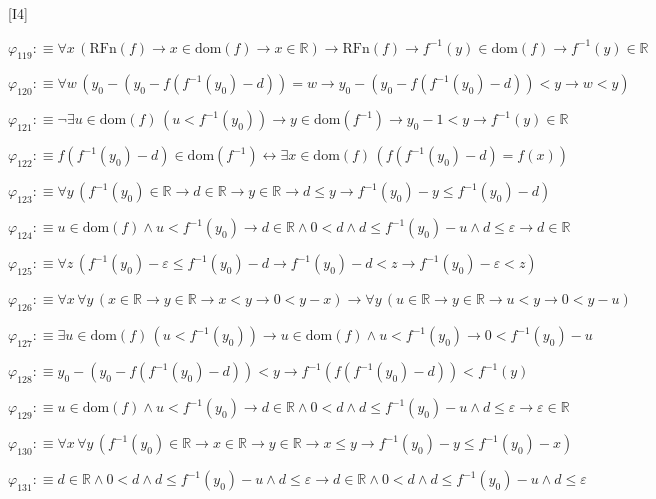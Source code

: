 \begin{fullproof}{[I4]}
\begin{abbrevlist}
\item $\varphi_{119} :\equiv \forall x\,(\mathrm{RFn}(f) \to x \in \mathrm{dom}(f) \to x \in \mathbb{R}) \to \mathrm{RFn}(f) \to f^{-1}(y) \in \mathrm{dom}(f) \to f^{-1}(y) \in \mathbb{R}$
\item $\varphi_{120} :\equiv \forall w\,(y_{0} - (y_{0} - f(f^{-1}(y_{0}) - d)) = w \to y_{0} - (y_{0} - f(f^{-1}(y_{0}) - d)) < y \to w < y)$
\item $\varphi_{121} :\equiv \neg \exists u \in \mathrm{dom}(f)\,(u < f^{-1}(y_{0})) \to y \in \mathrm{dom}(f^{-1}) \to y_{0} - 1 < y \to f^{-1}(y) \in \mathbb{R}$
\item $\varphi_{122} :\equiv f(f^{-1}(y_{0}) - d) \in \mathrm{dom}(f^{-1}) \leftrightarrow \exists x \in \mathrm{dom}(f)\,(f(f^{-1}(y_{0}) - d) = f(x))$
\item $\varphi_{123} :\equiv \forall y\,(f^{-1}(y_{0}) \in \mathbb{R} \to d \in \mathbb{R} \to y \in \mathbb{R} \to d \leq y \to f^{-1}(y_{0}) - y \leq f^{-1}(y_{0}) - d)$
\item $\varphi_{124} :\equiv u \in \mathrm{dom}(f) \land u < f^{-1}(y_{0}) \to d \in \mathbb{R} \land 0 < d \land d \leq f^{-1}(y_{0}) - u \land d \leq \varepsilon \to d \in \mathbb{R}$
\item $\varphi_{125} :\equiv \forall z\,(f^{-1}(y_{0}) - \varepsilon \leq f^{-1}(y_{0}) - d \to f^{-1}(y_{0}) - d < z \to f^{-1}(y_{0}) - \varepsilon < z)$
\item $\varphi_{126} :\equiv \forall x\,\forall y\,(x \in \mathbb{R} \to y \in \mathbb{R} \to x < y \to 0 < y - x) \to \forall y\,(u \in \mathbb{R} \to y \in \mathbb{R} \to u < y \to 0 < y - u)$
\item $\varphi_{127} :\equiv \exists u \in \mathrm{dom}(f)\,(u < f^{-1}(y_{0})) \to u \in \mathrm{dom}(f) \land u < f^{-1}(y_{0}) \to 0 < f^{-1}(y_{0}) - u$
\item $\varphi_{128} :\equiv y_{0} - (y_{0} - f(f^{-1}(y_{0}) - d)) < y \to f^{-1}(f(f^{-1}(y_{0}) - d)) < f^{-1}(y)$
\item $\varphi_{129} :\equiv u \in \mathrm{dom}(f) \land u < f^{-1}(y_{0}) \to d \in \mathbb{R} \land 0 < d \land d \leq f^{-1}(y_{0}) - u \land d \leq \varepsilon \to \varepsilon \in \mathbb{R}$
\item $\varphi_{130} :\equiv \forall x\,\forall y\,(f^{-1}(y_{0}) \in \mathbb{R} \to x \in \mathbb{R} \to y \in \mathbb{R} \to x \leq y \to f^{-1}(y_{0}) - y \leq f^{-1}(y_{0}) - x)$
\item $\varphi_{131} :\equiv d \in \mathbb{R} \land 0 < d \land d \leq f^{-1}(y_{0}) - u \land d \leq \varepsilon \to d \in \mathbb{R} \land 0 < d \land d \leq f^{-1}(y_{0}) - u \land d \leq \varepsilon$

\end{abbrevlist}
\end{fullproof}
